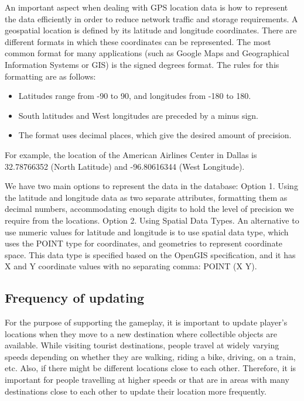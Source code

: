 \documentclass[conference]{IEEEtran}
\begin{document}
An important aspect when dealing with GPS location data is how to represent the data efficiently in order to reduce network traffic and storage requirements. A geospatial location is defined by its latitude and longitude coordinates. There are different formats in which these coordinates can be represented. The most common format for many applications (such as Google Maps and Geographical Information Systems or GIS) is the signed degrees format. The rules for this formatting are as follows:
\begin{itemize}
\item Latitudes range from -90 to 90, and longitudes from -180 to 180. 
\item South latitudes and West longitudes are preceded by a minus sign.
\item The format uses decimal places, which give the desired amount of precision. 
\end{itemize}

For example, the location of the American Airlines Center in Dallas is 32.78766352 (North Latitude) and  -96.80616344 (West Longitude).

We have two main options to represent the data in the database:
Option 1. Using the latitude and longitude data as two separate attributes, formatting them as decimal numbers, accommodating enough digits to hold the level of precision we require from the locations. 
Option 2. Using Spatial Data Types. An alternative to use numeric values for latitude and longitude is to use spatial data type, which uses the POINT type for coordinates, and geometries to represent coordinate space. This data type is specified based on the OpenGIS specification, and it has X and Y coordinate values with no separating comma: POINT (X Y). 

\subsection{Frequency of updating} 

For the purpose of supporting the gameplay, it is important to update player’s locations when they move to a new destination where collectible objects are available. While visiting tourist destinations, people travel at widely varying speeds depending on whether they are walking, riding a bike, driving, on a train, etc. Also, if there might be different locations close to each other. Therefore, it is important for people travelling at higher speeds or that are in areas with many destinations close to each other to update their location more frequently. 
\end{document}
